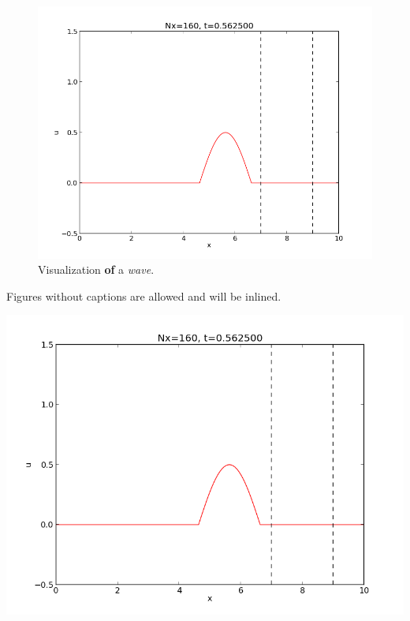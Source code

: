 \n\documentclass[%
oneside,                 %
final,                   %
10pt]{article}
\theoremstyle{definition}
\begin{document}
\begin{enumerate}
\begin{figure}[!ht]  %
  \centerline{\includegraphics[width=0.9\linewidth]{testfigs/wave1D.png}}
  \caption{
  Visualization \textbf{of} a \emph{wave}. \label{fig:impact}
  }
\end{figure}

Figures without captions are allowed and will be inlined.

\vspace{6mm}

\centerline{\includegraphics[width=0.9\linewidth]{testfigs/wave1D.png}}

\vspace{6mm}




\end{enumerate}
\end{document}

